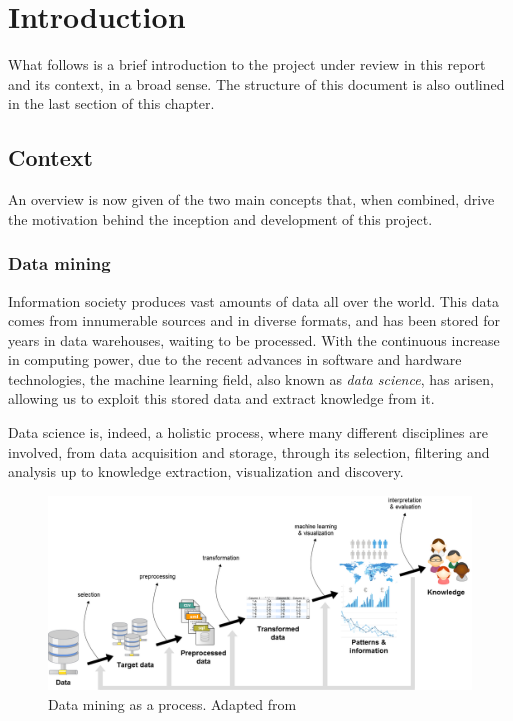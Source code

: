 \chapter{Introduction} %
\label{Chapter1Introduction} %


What follows is a brief introduction to the project under review in this report and its context,
in a broad sense. The structure of this document is also outlined in the last section of this chapter.

\section{Context}
\label{Introduction::Context}

An overview is now given of the two main concepts that, when combined,
drive the motivation behind the inception and development of this project.

\subsection{Data mining}
\label{Introduction::Context::DataMining}

Information society produces vast amounts of data all over the world.
This data comes from innumerable sources and in diverse formats, and has been stored
for years in data warehouses, waiting to be processed. With the continuous increase
in computing power, due to the recent advances in software and hardware technologies,
the machine learning field, also known as \textit{data science}, has arisen,
allowing us to exploit this stored data and extract knowledge from it.

Data science is, indeed, a holistic process, where many different disciplines are
involved, from data acquisition and storage, through its selection, filtering and
analysis up to knowledge extraction, visualization and discovery.

\begin{figure}[h]
	\centering
	\includegraphics[width=0.9\linewidth]{figures/data-mining-process.png}
	\caption{Data mining as a process. Adapted from~\citet{Fayyad:FromDataMining}}
	\label{fig:data-mining}
\end{figure}

